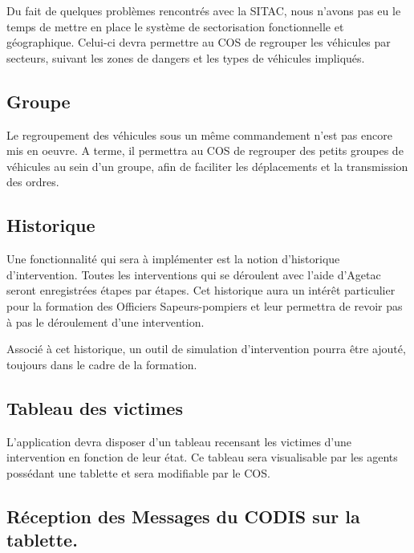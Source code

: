 \documentclass{article}
\begin{document}
Du fait de quelques problèmes rencontrés avec la SITAC, nous 
n'avons pas eu le temps de mettre en place le système de sectorisation fonctionnelle 
et géographique. Celui-ci devra permettre au COS de regrouper les véhicules par 
secteurs, suivant les zones de dangers et les types de véhicules impliqués.

\subsection{Groupe }

Le regroupement des véhicules sous un même commandement n'est 
pas encore mis en oeuvre. A terme, il permettra au COS de regrouper des petits 
groupes de véhicules au sein d'un groupe, afin de faciliter les déplacements 
et la transmission des ordres.

\subsection{Historique}

Une fonctionnalité qui sera à implémenter est la notion d'historique 
d'intervention. Toutes les interventions qui se déroulent avec l'aide d'Agetac 
seront enregistrées étapes par étapes. Cet historique aura un intérêt particulier 
pour la formation des Officiers Sapeurs-pompiers et leur permettra de revoir pas 
à pas le déroulement d'une intervention.

Associé à cet historique, un outil de simulation d'intervention 
pourra être ajouté, toujours dans le cadre de la formation.

\subsection{Tableau des victimes}

L'application devra disposer d'un tableau recensant les victimes 
d'une intervention en fonction de leur état. Ce tableau sera visualisable par 
les agents possédant une tablette et sera modifiable par le COS.

\subsection{Réception des Messages du CODIS sur la tablette.}
\end{document}
